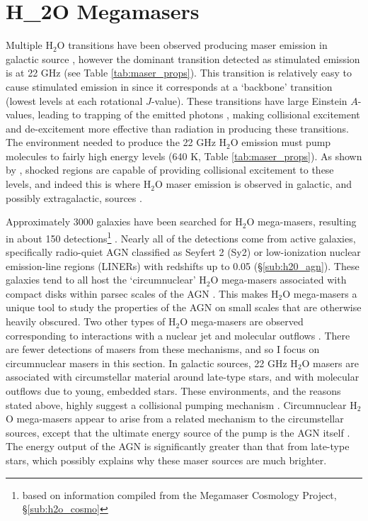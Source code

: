 \section{H_2O Megamasers}
\label{sec:h2o_mm}

Multiple H$_2$O transitions have been observed producing maser emission in galactic source \citep{Elitzur_1992}, however the dominant transition detected as stimulated emission is at 22 GHz (see Table \ref{tab:maser_props}). This transition is relatively easy to cause stimulated emission in since it corresponds at a `backbone' transition (lowest levels at each rotational $J$-value). These transitions have large Einstein $A$-values, leading to trapping of the emitted photons \citep{stahler_palla_2004}, making collisional excitement and de-excitement more effective than radiation in producing these transitions. The environment needed to produce the 22 GHz H$_2$O emission must pump molecules to fairly high energy levels (640 K, Table \ref{tab:maser_props}). As shown by \citet{stahler_palla_2004}, shocked regions are capable of providing collisional excitement to these levels, and indeed this is where H$_2$O maser emission is observed in galactic, and possibly extragalactic, sources \citep{Elitzur_1992,lo2005}. 

Approximately 3000 galaxies have been searched for H$_2$O mega-masers, resulting in about 150 detections\footnote{based on information compiled from the Megamaser Cosmology Project, \S\ref{sub:h2o_cosmo}}  \citep{tarchi2012}. Nearly all of the detections come from active galaxies, specifically radio-quiet AGN classified as Seyfert 2 (Sy2) or low-ionization nuclear emission-line regions (LINERs) with redshifts up to 0.05 (\S\ref{sub:h20_agn}). These galaxies tend to all host the `circumnuclear' H$_2$O mega-masers associated with compact disks within parsec scales of the AGN \citep{lo2005}. This makes H$_2$O mega-masers a unique tool to study the properties of the AGN on small scales that are otherwise heavily obscured. Two other types of H$_2$O mega-masers are observed corresponding to interactions with a nuclear jet and molecular outflows \citep{lo2005, tarchi2012}. There are fewer detections of masers from these mechanisms, and so I focus on circumnuclear masers in this section. In galactic sources, 22 GHz H$_2$O masers are associated with circumstellar material around late-type stars, and with molecular outflows due to young, embedded stars. These environments, and the reasons stated above, highly suggest a collisional pumping mechanism \citep{Elitzur_1992}. Circumnuclear H$_2$O mega-masers appear to arise from a related mechanism to the circumstellar sources, except that the ultimate energy source of the pump is the AGN itself \citep{lo2005}. The energy output of the AGN is significantly greater than that from late-type stars, which possibly explains why these maser sources are much brighter. 

